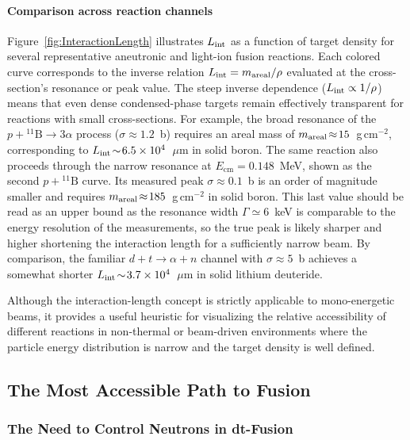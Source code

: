 \documentclass[particles,article,accept,pdftex,moreauthors]{Definitions/mdpi}
\begin{document}
\paragraph*{\bf Comparison across reaction channels}
Figure~\ref{fig:InteractionLength} illustrates $L_{\rm int}$ as a function of target density for several representative aneutronic and light-ion fusion reactions. Each colored curve corresponds to the inverse relation $L_{\rm int} = m_{\rm areal}/\rho$ evaluated at the cross-section's resonance or peak value. The steep inverse dependence ($L_{\rm int}\propto 1/\rho$) means that even dense condensed-phase targets remain effectively transparent for reactions with small cross-sections. For example, the broad resonance of the $p+{}^{11}\mathrm{B}\!\to\!3\alpha$ process ($\sigma\!\approx\!1.2$~b) requires an areal mass of $m_{\rm areal}\!\approx\!15$~g\,cm${}^{-2}$, corresponding to $L_{\rm int}\!\sim\!6.5\times10^{4}$~$\mu$m in solid boron. The same reaction also proceeds through the narrow resonance at $E_\mathrm{cm}=0.148$~MeV, shown as the second $p+{}^{11}\mathrm{B}$ curve. Its measured peak $\sigma\!\approx\!0.1$~b is an order of magnitude smaller and requires $m_{\rm areal}\!\approx\!185$~g\,cm${}^{-2}$ in solid boron. This last value should be read as an upper bound as the resonance width $\Gamma\!\simeq\!6$~keV is comparable to the energy resolution of the measurements, so the true peak is likely sharper and higher shortening the interaction length for a sufficiently narrow beam. By comparison, the familiar $d+t\!\to\!\alpha+n$ channel with $\sigma\!\approx\!5$~b achieves a somewhat shorter $L_{\rm int}\!\sim\!3.7\times10^{4}$~$\mu$m in solid lithium deuteride.

Although the interaction-length concept is strictly applicable to mono-energetic beams, it provides a useful heuristic for visualizing the relative accessibility of different reactions in non-thermal or beam-driven environments where the particle energy distribution is narrow and the target density is well defined.

\subsection{The Most Accessible Path to Fusion}\label{ssec:eazyfusion}
\subsubsection{The Need to Control Neutrons in dt-Fusion}\label{sssec:ICFneutrons}
\end{document}
